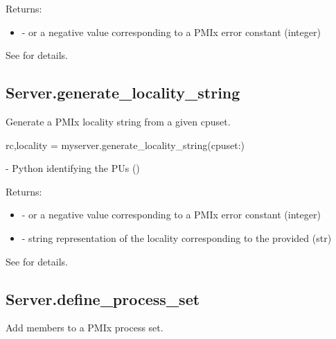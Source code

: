 Returns:

\begin{itemize}
    \item {} -  or a negative value corresponding to a PMIx error constant (integer)
\end{itemize}

See  for details.


\subsection{Server.generate_locality_string}

\summary
Generate a \ac{PMIx} locality string from a given cpuset.

\format

\pyspecificstart
\begin{codepar}
rc,locality = myserver.generate_locality_string(cpuset:)
\end{codepar}
\pyspecificend


\begin{arglist}
 - Python  identifying the \acp{PU} ()
\end{arglist}

Returns:

\begin{itemize}
    \item {} -  or a negative value corresponding to a PMIx error constant (integer)
    \item {} - string representation of the locality corresponding to the provided  (str)
\end{itemize}

See  for details.


\subsection{Server.define_process_set}

\summary
Add members to a \ac{PMIx} process set.

